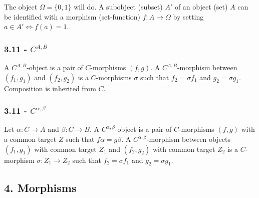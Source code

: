 \documentclass{article}
\begin{document}
The object $\Omega = \{0, 1\}$ will do. A subobject (subset) $A'$ of an object (set) $A$ can be identified with a morphism (set-function) $f: A \to \Omega$ by setting $a \in A' \iff f(a) = 1$.

\subsubsection*{3.11 - $C^{A,B}$}

A $C^{A,B}$-object is a pair of $C$-morphisms $(f, g)$. A $C^{A,B}$-morphism between $(f_1, g_1)$ and $(f_2, g_2)$ is a $C$-morphisms $\sigma$ such that $f_2 = \sigma f_1$ and $g_2 = \sigma g_1$. Composition is inherited from $C$.


\subsubsection*{3.11 - $C^{\alpha, \beta}$}

Let $\alpha: C \to A$ and $\beta: C \to B$. A $C^{\alpha, \beta}$-object is a pair of $C$-morphisms $(f, g)$ with a common target $Z$ such that $f\alpha = g\beta$. A $C^{\alpha, \beta}$-morphism between objects $(f_1, g_1)$ with common target $Z_1$ and $(f_2, g_2)$ with common target $Z_2$ is a $C$-morphism $\sigma: Z_1 \to Z_2$ such that $f_2 = \sigma f_1$ and $g_2 = \sigma g_1$.


\subsection*{4. Morphisms}
\end{document}
